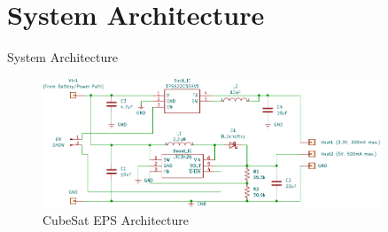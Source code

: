\documentclass[aspectratio=169]{beamer}
\begin{document}
	\section{System Architecture}
	\begin{frame}{System Architecture}
		
		\begin{figure}[h]
			\centering
			\includegraphics[width=0.9\textwidth]{diag/1.pdf}
			\caption{CubeSat EPS Architecture}
			\label{fig:mesh1}
		\end{figure}
		
		
	\end{frame}
\end{document}
